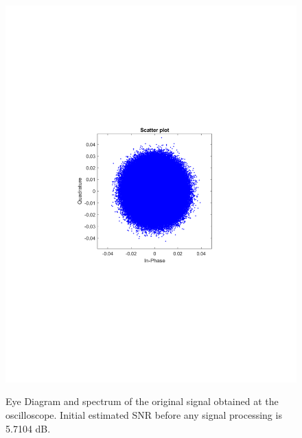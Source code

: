 \begin{refsection}
\begin{figure}[H]
\begin{minipage}{0.30\textwidth}
		\includegraphics[clip, trim=4cm 8cm 4cm 8cm, width=1\textwidth]{./sdf/m_qam_system/figures/expResults/intradyne/0_const_4GBdInSig13dB_bfFec.pdf}
		\label{fig:4GBdSpecBefFec}
	\end{minipage}
	\caption{Eye Diagram and spectrum of the original signal obtained at the oscilloscope. Initial estimated SNR before any signal processing is 5.7104 dB.}
	\label{fig:4GBdinit}
\end{figure}


\end{refsection}
